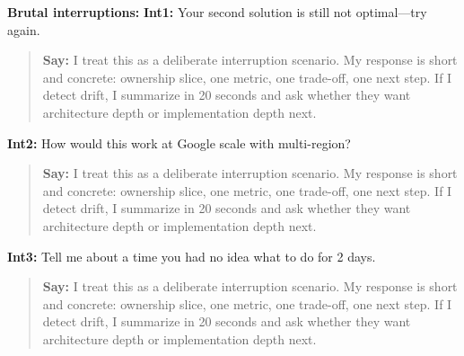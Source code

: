 \documentclass[9pt,a4paper]{article}
\begin{document}
\textbf{Brutal interruptions:}
\textbf{Int1:} Your second solution is still not optimal---try again.

\begin{quote}\small\textbf{Say:} I treat this as a deliberate interruption scenario. My response is short and concrete: ownership slice, one metric, one trade-off, one next step. If I detect drift, I summarize in 20 seconds and ask whether they want architecture depth or implementation depth next.\end{quote}
\vspace{2mm}
\textbf{Int2:} How would this work at Google scale with multi-region?

\begin{quote}\small\textbf{Say:} I treat this as a deliberate interruption scenario. My response is short and concrete: ownership slice, one metric, one trade-off, one next step. If I detect drift, I summarize in 20 seconds and ask whether they want architecture depth or implementation depth next.\end{quote}
\vspace{2mm}
\textbf{Int3:} Tell me about a time you had no idea what to do for 2 days.

\begin{quote}\small\textbf{Say:} I treat this as a deliberate interruption scenario. My response is short and concrete: ownership slice, one metric, one trade-off, one next step. If I detect drift, I summarize in 20 seconds and ask whether they want architecture depth or implementation depth next.\end{quote}
\vspace{2mm}
\end{document}
